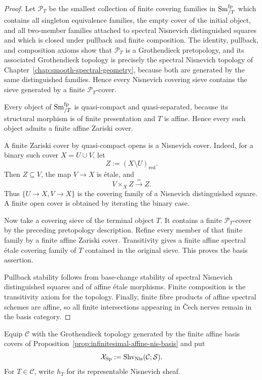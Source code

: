 \begin{proof}
Let $\mathcal P_T$ be the smallest collection of finite covering families in
$\operatorname{Sm}^{\mathrm{fp}}_{/T}$ which contains all singleton equivalence
families, the empty cover of the initial object, and all two-member families
attached to spectral Nisnevich distinguished squares and which is closed
under pullback and finite composition.  The identity, pullback, and
composition axioms show that $\mathcal P_T$ is a Grothendieck pretopology,
and its associated Grothendieck topology is precisely the spectral Nisnevich
topology of Chapter~\ref{chap:smooth-spectral-geometry}, because both are
generated by the same distinguished families.  Hence every Nisnevich covering
sieve contains the sieve generated by a finite $\mathcal P_T$-cover.

Every object of $\operatorname{Sm}^{\mathrm{fp}}_{/T}$ is quasi-compact and
quasi-separated, because its structural morphism is of finite presentation
and $T$ is affine.  Hence every such object admits a finite affine Zariski
cover.

A finite Zariski cover by quasi-compact opens is a Nisnevich cover.  Indeed,
for a binary such cover $X=U\cup V$, let
\[
    Z:=(X\setminus U)_{\mathrm{red}}.
\]
Then $Z\subseteq V$, the map $V\to X$ is \'etale, and
\[
    V\times_XZ\xrightarrow{\simeq}Z.
\]
Thus $\{U\to X,V\to X\}$ is the covering family of a Nisnevich distinguished
square.  A finite open cover is obtained by iterating the binary case.

Now take a covering sieve of the terminal object $T$.  It contains a finite
$\mathcal P_T$-cover by the preceding pretopology description.  Refine every
member of that finite family by a finite affine Zariski cover.  Transitivity
gives a finite affine spectral \'etale covering family of $T$ contained in
the original sieve.  This proves the basis assertion.

Pullback stability follows from base-change stability of spectral Nisnevich
distinguished squares and of affine \'etale morphisms.  Finite composition is
the transitivity axiom for the topology.  Finally, finite fibre products of
affine spectral schemes are affine, so all finite intersections appearing in
\v{C}ech nerves remain in the basis category.
\end{proof}

\begin{definition}
\label{def:infinitesimal-native-topos}
Equip $\mathcal C$ with the Grothendieck topology generated by the finite
affine basis covers of Proposition~\ref{prop:infinitesimal-affine-nis-basis}
and put
\[
    \mathcal X_{\mathrm{Sp}}
    :=
    \operatorname{Shv}_{\mathrm{Nis}}(\mathcal C;\mathcal S).
\]
For $T\in\mathcal C$, write $h_T$ for its representable Nisnevich sheaf.
\end{definition}

